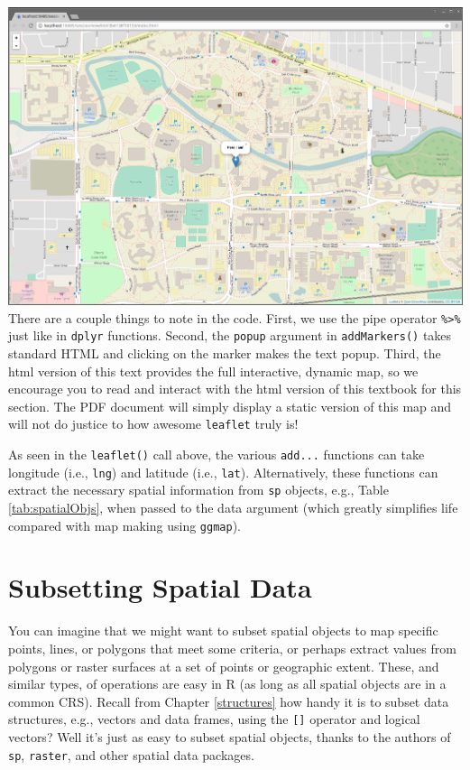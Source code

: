 \documentclass[
]{krantz}
\begin{document}
\includegraphics[width=1\linewidth]{../figures/leaflet-here-i-am}
There are a couple things to note in the code. First, we use the pipe operator \texttt{\%\textgreater{}\%} just like in \texttt{dplyr} functions. Second, the \texttt{popup} argument in \texttt{addMarkers()} takes standard HTML and clicking on the marker makes the text popup. Third, the html version of this text provides the full interactive, dynamic map, so we encourage you to read and interact with the html version of this textbook for this section. The PDF document will simply display a static version of this map and will not do justice to how awesome \texttt{leaflet} truly is!

As seen in the \texttt{leaflet()} call above, the various \texttt{add...} functions can take longitude (i.e., \texttt{lng}) and latitude (i.e., \texttt{lat}). Alternatively, these functions can extract the necessary spatial information from \texttt{sp} objects, e.g., Table \ref{tab:spatialObjs}, when passed to the data argument (which greatly simplifies life compared with map making using \texttt{ggmap}).

\hypertarget{subsetting-spatial-data}{%
\section{Subsetting Spatial Data}\label{subsetting-spatial-data}}

You can imagine that we might want to subset spatial objects to map specific points, lines, or polygons that meet some criteria, or perhaps extract values from polygons or raster surfaces at a set of points or geographic extent. These, and similar types, of operations are easy in R (as long as all spatial objects are in a common CRS). Recall from Chapter \ref{structures} how handy it is to subset data structures, e.g., vectors and data frames, using the \texttt{{[}{]}} operator and logical vectors? Well it's just as easy to subset spatial objects, thanks to the authors of \texttt{sp}, \texttt{raster}, and other spatial data packages.
\end{document}
